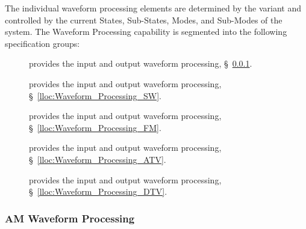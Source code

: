 The individual waveform processing elements are determined by the \ThisSys variant and controlled by the current States, Sub-States, Modes, and Sub-Modes of the system.
The \ThisSys Waveform Processing capability is segmented into the following specification groups:
\begin{description}
	\item[\AM]        provides the \AM                input and output waveform processing, \S~\ref{lloc:Waveform_Processing_AM}.
	\item[\SW]        provides the \SW                input and output waveform processing, \S~\ref{lloc:Waveform_Processing_SW}.
	\item[\FM]        provides the \FM                input and output waveform processing, \S~\ref{lloc:Waveform_Processing_FM}.
	\item[\ATV]  			provides the \ATV         			input and output waveform processing, \S~\ref{lloc:Waveform_Processing_ATV}.
	\item[\DTV] 			provides the \DTV        				input and output waveform processing, \S~\ref{lloc:Waveform_Processing_DTV}.
\end{description}


\KNEADSUBSUBSECTIONNEWPAGE
\subsubsection{AM Waveform Processing}
\label{lloc:Waveform_Processing_AM}
\renewcommand{\ThisSegment}{\AM Waveform Processing\xspace}%



